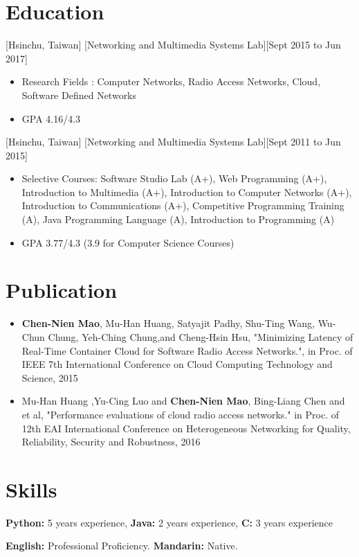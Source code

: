 \documentclass{article}
\begin{document}
\section{Education}
[Hsinchu, Taiwan]
[Networking and Multimedia Systems Lab][Sept 2015 to Jun 2017]

\begin{itemize}
\item Research Fields : Computer Networks, Radio Access Networks, Cloud, Software Defined
Networks
\item GPA 4.16/4.3
\end{itemize}

[Hsinchu, Taiwan]
[Networking and Multimedia Systems Lab][Sept 2011 to Jun 2015]
\begin{itemize}
\item Selective Courses: Software Studio Lab (A+), Web Programming (A+), Introduction to Multimedia (A+), Introduction to Computer Networks (A+), Introduction to Communications (A+), Competitive Programming Training (A), Java Programming Language (A), Introduction to Programming (A)
\item GPA 3.77/4.3 (3.9 for Computer Science Courses)
\end{itemize}

\section{Publication}
\begin{itemize}
\item  \textbf{Chen-Nien Mao}, Mu-Han Huang, Satyajit Padhy, Shu-Ting Wang, Wu-Chun Chung, Yeh-Ching Chung,and Cheng-Hsin Hsu, "Minimizing Latency of Real-Time Container Cloud for Software Radio Access Networks.", in Proc. of IEEE 7th International Conference on Cloud Computing Technology and Science,
2015  
\item Mu-Han Huang ,Yu-Cing Luo and \textbf{Chen-Nien Mao}, Bing-Liang Chen and et al, "Performance evaluations of cloud radio access networks." in Proc. of 12th EAI International Conference on Heterogeneous Networking for Quality, Reliability, Security and Robustness, 2016
\end{itemize}

\section{Skills}
\begin{description}[widest=Langauges]
\item[Technical Skills:]
\textbf{Python:} 5 years experience,
\textbf{Java:} 2 years experience,
\textbf{C:} 3 years experience
\item[Languages:] \textbf{English:} Professional Proficiency. \textbf{Mandarin:} Native.
\end{description}
\end{document}
